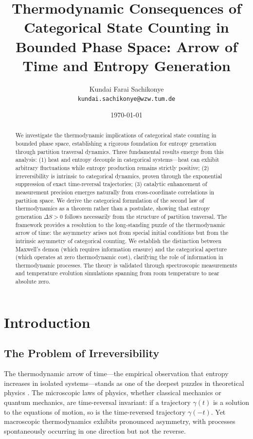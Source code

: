 \documentclass[twocolumn,10pt]{article}
\title{Thermodynamic Consequences of Categorical State Counting in Bounded Phase Space: Arrow of Time and Entropy Generation}
\author{
    Kundai Farai Sachikonye\\
    \texttt{kundai.sachikonye@wzw.tum.de}
}
\date{\today}
\begin{document}
\maketitle

\begin{abstract}
We investigate the thermodynamic implications of categorical state counting in bounded phase space, establishing a rigorous foundation for entropy generation through partition traversal dynamics. Three fundamental results emerge from this analysis: (1) heat and entropy decouple in categorical systems---heat can exhibit arbitrary fluctuations while entropy production remains strictly positive; (2) irreversibility is intrinsic to categorical dynamics, proven through the exponential suppression of exact time-reversal trajectories; (3) catalytic enhancement of measurement precision emerges naturally from cross-coordinate correlations in partition space. We derive the categorical formulation of the second law of thermodynamics as a theorem rather than a postulate, showing that entropy generation $\Delta S > 0$ follows necessarily from the structure of partition traversal. The framework provides a resolution to the long-standing puzzle of the thermodynamic arrow of time: the asymmetry arises not from special initial conditions but from the intrinsic asymmetry of categorical counting. We establish the distinction between Maxwell's demon (which requires information erasure) and the categorical aperture (which operates at zero thermodynamic cost), clarifying the role of information in thermodynamic processes. The theory is validated through spectroscopic measurements and temperature evolution simulations spanning from room temperature to near absolute zero.
\end{abstract}

\section{Introduction}

\subsection{The Problem of Irreversibility}

The thermodynamic arrow of time---the empirical observation that entropy increases in isolated systems---stands as one of the deepest puzzles in theoretical physics \cite{boltzmann1877,penrose1989,price1996,lebowitz1993}. The microscopic laws of physics, whether classical mechanics or quantum mechanics, are time-reversal invariant: if a trajectory $\gamma(t)$ is a solution to the equations of motion, so is the time-reversed trajectory $\gamma(-t)$. Yet macroscopic thermodynamics exhibits pronounced asymmetry, with processes spontaneously occurring in one direction but not the reverse.
\end{document}
